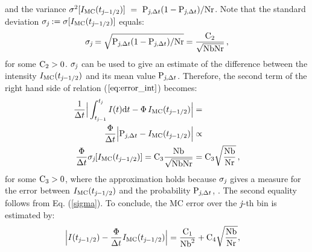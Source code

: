 and the variance $\sigma^2[I_{\textrm{MC}}(t_{\textit{j}-1/2})] ~=~ \textrm{P}_{\textit{j}, \Delta t}(1-\textrm{P}_{\textit{j}, \Delta t})/\textrm{Nr}$.
Note that the standard deviation $\sigma_{\textit{j}}:=\sigma[I_{\textrm{MC}}(t_{\textit{j}-1/2})]$ equals:
\begin{equation}\label{sigma}
\sigma_{\textit{j}}= \sqrt{\textrm{P}_{\textit{j}, \Delta t}(1-\textrm{P}_{\textit{j}, \Delta t})/\textrm{Nr}}= \frac{\textrm{C}_2}{\sqrt{\textrm{Nb}\textrm{Nr}}}\,, \end{equation}
 for some $\textrm{C}_{2}>0$. $\sigma_{\textit{j}}$ can be used to give an estimate of the difference between the intensity $I_{\textrm{MC}}(t_{\textit{j}-1/2})$ and its mean value $\textrm{P}_{\textit{j}, \Delta t}$.
Therefore, the second term of the right hand side of relation ($\ref{eq:error_int}$) becomes:
\begin{equation}\begin{aligned}
\frac{1}{\Delta t}\Big|\int_{t_{\textit{j}-1}}^{t_{\textit{j}}} I(t)\textrm{d}t -
\Phi\, I_{\textrm{MC}}(t_{\textit{j}-1/2})\Big| &=  \\
\frac{\Phi}{\Delta t}\Big|\textrm{P}_{\textit{j}, \Delta t} -I_{\textrm{MC}}(t_{\textit{j}-1/2})\Big| &\propto  \\
  \frac{\Phi}{\Delta t}
\sigma_{\textit{j}}[I_{\textrm{MC}}(t_{\textit{j}-1/2})]=\textrm{C}_3\frac{\textrm{Nb}}{\sqrt{\textrm{Nb}\textrm{Nr}}} & = \textrm{C}_3\sqrt{\frac{\textrm{Nb}}{\textrm{Nr}}}\,,
\end{aligned}
\end{equation}
for some $\textrm{C}_3>0$, where the approximation holds because $\sigma_{\textit{j}}$ gives a measure for the error between
$I_{\textrm{MC}}(t_{\textit{j}-1/2})$ and the probability $\textrm{P}_{\textit{j}, \Delta t}$, \cite{diez2012openintro}. The second equality follows from Eq. (\ref{sigma}). To conclude, the MC error over the $\textit{j}$-th bin is estimated by:
\begin{equation} \begin{aligned}
\Big|I(t_{\textit{j}-1/2})&-\frac{\Phi}
{\Delta t}I_{\textrm{MC}}(t_{\textit{j}-1/2})\Big| =
\frac{\textrm{C}_1}{\textrm{Nb}^2} + \textrm{C}_4\sqrt{\frac{\textrm{Nb}}{\textrm{Nr}}},
\end{aligned}
\end{equation}
